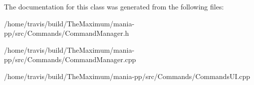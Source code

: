 The documentation for this class was generated from the following files\-:\begin{DoxyCompactItemize}
\item 
/home/travis/build/\-The\-Maximum/mania-\/pp/src/\-Commands/Command\-Manager.\-h\item 
/home/travis/build/\-The\-Maximum/mania-\/pp/src/\-Commands/Command\-Manager.\-cpp\item 
/home/travis/build/\-The\-Maximum/mania-\/pp/src/\-Commands/Commands\-U\-I.\-cpp\end{DoxyCompactItemize}
